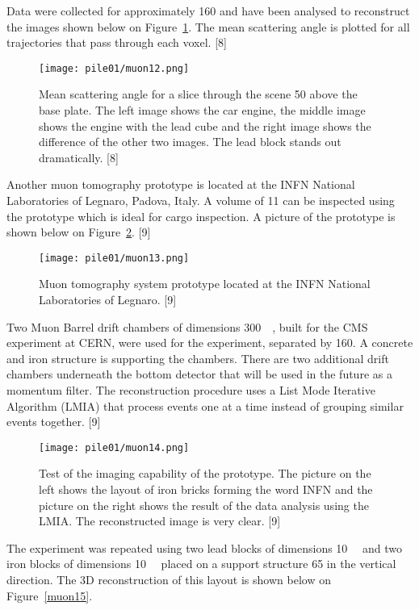 \documentclass[twocolumn,a4paper]{article}
\begin{document}
Data were collected for approximately \unit{160}{\minute} and have been analysed to reconstruct the images
shown below on Figure~\ref{muon12}. The mean scattering angle is plotted for all trajectories that pass through
each voxel. [8]

\begin{figure}
  \texttt{[image: pile01/muon12.png]}
  \caption{Mean scattering angle for a slice through the scene \unit{50}{\centi\metre} above the base plate. The left
image shows the car engine, the middle image shows the engine with the lead cube and the right
image shows the difference of the other two images. The lead block stands out dramatically. [8]}
  \label{muon12}
\end{figure}

Another muon tomography prototype is located at the INFN National Laboratories of Legnaro,
Padova, Italy. A volume of \unit{11}{\cubic\metre} can be inspected using the prototype which is ideal for cargo
inspection. A picture of the prototype is shown below on Figure~\ref{muon13}. [9]

\begin{figure}
  \texttt{[image: pile01/muon13.png]}
  \caption{Muon tomography system prototype located at the INFN National Laboratories of
Legnaro. [9]}
  \label{muon13}
\end{figure}

Two Muon Barrel drift chambers of dimensions \unit{300}{\cubic{\centi\metre}}, built for the CMS experiment at
CERN, were used for the experiment, separated by \unit{160}{\centi\metre}. A concrete and iron structure is
supporting the chambers. There are two additional drift chambers underneath the bottom detector
that will be used in the future as a momentum filter. The reconstruction procedure uses a List Mode
Iterative Algorithm (LMIA) that process events one at a time instead of grouping similar events
together. [9]

\begin{figure}
  \texttt{[image: pile01/muon14.png]}
  \caption{Test of the imaging capability of the prototype. The picture on the left shows the layout of
iron bricks forming the word INFN and the picture on the right shows the result of the data analysis
using the LMIA. The reconstructed image is very clear. [9]}
  \label{muon14}
\end{figure}

The experiment was repeated using two lead blocks of dimensions \unit{10}{\cubic{\centi\metre}} and two iron
blocks of dimensions \unit{10}{\cubic{\centi\metre}} placed on a support structure \unit{65}{\centi\metre} in the vertical direction. The
3D reconstruction of this layout is shown below on Figure~\ref{muon15}.
\end{document}
